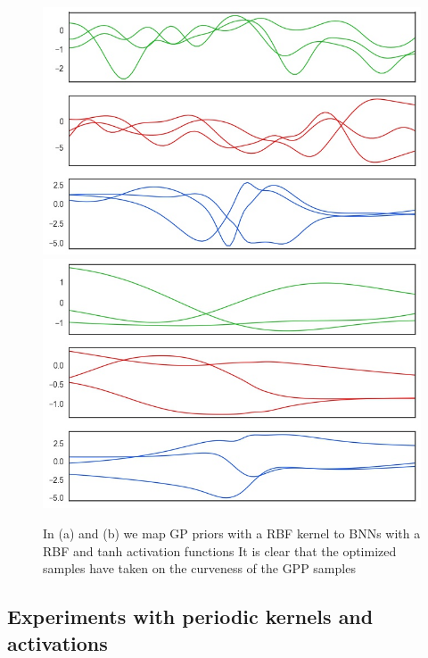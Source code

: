 \documentclass{article}
\begin{document}
\begin{figure}[h]\centering
{
\includegraphics[width=.45\textwidth]{figs/rbfrbf}
}
{
\includegraphics[width=.45\textwidth]{figs/rbftanh}
}
\hspace{3cm}
\caption{ In (a) and (b) we map GP priors with a RBF kernel to BNNs with a RBF and tanh activation functions
It is clear that the optimized samples have taken on the curveness of the GPP samples} \label{fig:1}
\end{figure}

\newpage 

\subsection{Experiments with periodic kernels and activations}
\end{document}
